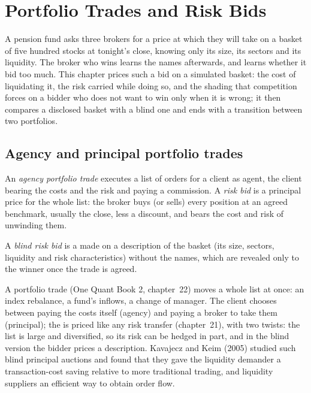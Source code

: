 \chapter{Portfolio Trades and Risk Bids}\label{ch:mx:portfolio-trades-and-risk-bids}

A pension fund asks three brokers for a price at which they will take on a basket of five hundred stocks at tonight's close, knowing only its size,
its sectors and its liquidity. The broker who wins learns the names afterwards, and learns whether it bid too much. This chapter prices such a bid on
a simulated basket: the cost of liquidating it, the risk carried while doing so, and the shading that competition forces on a bidder who does not want
to win only when it is wrong; it then compares a disclosed basket with a blind one and ends with a transition between two portfolios.

\section{Agency and principal portfolio trades}

\begin{definition}\label{def:mx:portfolio-trades-and-risk-bids:agency}
An \emph{agency portfolio trade} executes a list of orders for a client as agent, the client bearing the costs and the
risk and paying a commission. A \emph{risk bid} is a principal price for the whole list: the broker buys (or sells) every position at
an agreed benchmark, usually the close, less a discount, and bears the cost and risk of unwinding them.
\end{definition}

\begin{definition}\label{def:mx:portfolio-trades-and-risk-bids:blind}
A \emph{blind risk bid} is a  made on a description of the basket (its size, sectors, liquidity and risk
characteristics) without the names, which are revealed only to the winner once the trade is agreed.
\end{definition}

A portfolio trade (One Quant Book 2, chapter~22) moves a whole list at once: an index rebalance, a fund's inflows, a change of manager. The client
chooses between paying the costs itself (agency) and paying a broker to take them (principal); the  is priced like any risk transfer
(chapter~21), with two twists: the list is large and diversified, so its risk can be hedged in part, and in the blind version the bidder prices a
description. Kavajecz and Keim (2005) studied such blind principal auctions and found that they gave the liquidity demander a transaction-cost saving
relative to more traditional trading, and liquidity suppliers an efficient way to obtain order flow.

